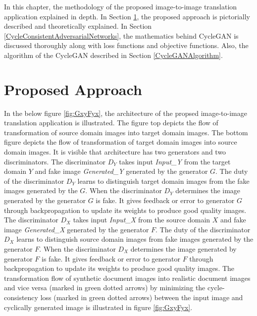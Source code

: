 \justifying
\setlength{\parskip}{1em}

In this chapter, the methodology of the proposed image-to-image translation application explained in depth. In Section \ref{ProposedApproach}, the proposed approach is pictorially described and theoretically explained. In Section \ref{CycleConsistentAdversarialNetworks}, the mathematics behind \ac{CycleGAN} is discussed thoroughly along with loss functions and objective functions. Also, the algorithm of the \ac{CycleGAN} described in Section \ref{CycleGANAlgorithm}.

\section{Proposed Approach}\label{ProposedApproach}

In the below figure \ref{fig:GxyFyx}, the architecture of the propsed image-to-image translation application is illustrated. The figure top depicts the flow of transformation of source domain images into target domain images. The bottom figure depicts the flow of transformation of target domain images into source domain images. It is visible that architecture has two generators and two discriminators. The discriminator $D_Y$ takes input \textit{Input\_Y} from the target domain $Y$ and fake image \textit{Generated\_Y} generated by the generator $G$. The duty of the discriminator $D_Y$ learns to distinguish target domain images from the fake images generated by the $G$. When the discriminator $D_Y$ determines the image generated by the generator $G$ is fake. It gives feedback or error to generator $G$ through backpropagation to update its weights to produce good quality images. The discriminator $D_X$ takes input \textit{Input\_X} from the source domain $X$ and fake image \textit{Generated\_X} generated by the generator $F$. The duty of the discriminator $D_X$ learns to distinguish source domain images from fake images generated by the generator $F$. When the discriminator $D_X$ determines the image generated by generator $F$ is fake. It gives feedback or error to generator $F$ through backpropagation to update its weights to produce good quality images. The transformation flow of synthetic document images into realistic document images and vice versa (marked in green dotted arrows) by minimizing the cycle-consistency loss (marked in green dotted arrows) between the input image and cyclically generated image is illustrated in figure \ref{fig:GxyFyx}.

